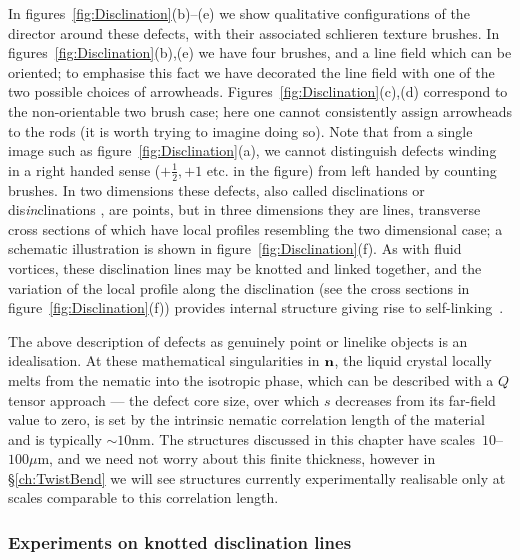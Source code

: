 In figures~\ref{fig:Disclination}(b)--(e) we show qualitative configurations of the director around these defects, with their associated schlieren texture brushes. In figures~\ref{fig:Disclination}(b),(e) we have four brushes, and a line field which can be oriented; to emphasise this fact we have decorated the line field with one of the two possible choices of arrowheads. Figures~\ref{fig:Disclination}(c),(d) correspond to the non-orientable two brush case; here one cannot consistently assign arrowheads to the rods (it is worth trying to imagine doing so). Note that from a single image such as figure~\ref{fig:Disclination}(a), we cannot distinguish defects winding in a right handed sense ($+\frac{1}{2}, +1$ etc. in the figure) from left handed by counting brushes. In two dimensions these defects, also called disclinations or dis\emph{in}clinations \citep{Frank1958}, are points, but in three dimensions they are lines, transverse cross sections of which have local profiles resembling the two dimensional case; a schematic illustration is shown in figure~\ref{fig:Disclination}(f). As with fluid vortices, these disclination lines may be knotted and linked together, and the variation of the local profile along the disclination (see the cross sections in figure~\ref{fig:Disclination}(f)) provides internal structure giving rise to self-linking~\citep{Copar2011}.

The above description of defects as genuinely point or linelike objects is an idealisation. At these mathematical singularities in $\bf n$, the liquid crystal locally melts from the nematic into the isotropic phase, which can be described with a $Q$ tensor approach --- the defect core size, over which $s$ decreases from its far-field value to zero, is set by the intrinsic nematic correlation length of the material~\citep{deGennes1992} and is typically $\sim10$nm. The structures discussed in this chapter have scales~$10$--$100\mu$m, and we need not worry about this finite thickness, however in \S\ref{ch:TwistBend} we will see structures currently experimentally realisable only at scales comparable to this correlation length.   

\subsubsection{Experiments on knotted disclination lines}

